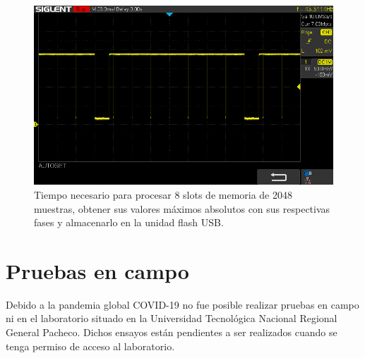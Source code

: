 \begin{figure}[ht]
	\centering
	\includegraphics[width=133mm]{./Figures/tiempoSaveAll.png}
	\caption{Tiempo necesario para procesar 8 slots de memoria de 2048 muestras, obtener sus valores máximos absolutos con sus respectivas fases y almacenarlo en la unidad flash USB.}
	\label{fig:tiempoSaveAll}
\end{figure}

\newpage

\section{Pruebas en campo}
Debido a la pandemia global COVID-19 no fue posible realizar pruebas en campo ni en el laboratorio situado en la Universidad Tecnológica Nacional Regional General Pacheco. Dichos ensayos están pendientes a ser realizados cuando se tenga permiso de acceso al laboratorio.